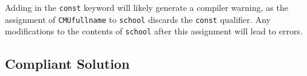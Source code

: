    Adding in the {\tt const} keyword will likely generate a compiler warning, as the assignment of {\tt CMUfullname} to {\tt school} discards the {\tt const} qualifier. Any modifications to the contents of {\tt school} after this assignment will lead to errors.

   \subsection{Compliant Solution}

